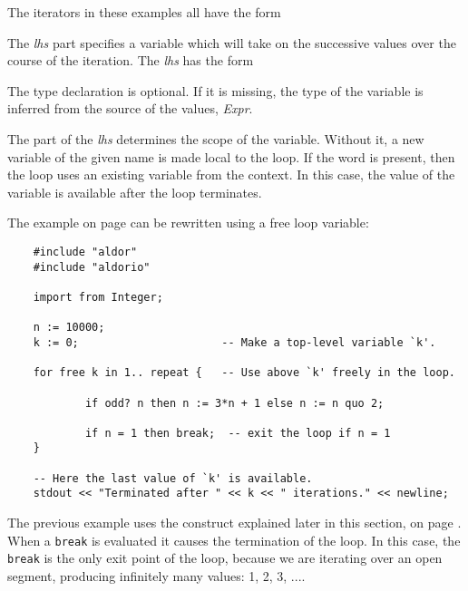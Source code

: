 The  iterators in these examples all have the form



The {\em lhs\/} part specifies a variable which will take on the
successive values over the course of the iteration.
The {\em lhs\/} has the form


The type declaration is optional.  If it is missing, the type of the
variable is inferred from the source of the values, {\em Expr}.

The  part of the {\em lhs} determines the scope of the variable.
Without it, a new variable of the given name is made local to the loop.
If the word  is present, then the loop uses an existing
variable from the context.  In this case, the value of the variable
is available after the loop terminates.

The example on page \pageref{asugLangWhileExample} can be rewritten using a
free loop variable:

\label{asugLangForExample} 

\begin{small}
\begin{verbatim}
    #include "aldor"
    #include "aldorio"

    import from Integer;

    n := 10000;
    k := 0;                      -- Make a top-level variable `k'.

    for free k in 1.. repeat {   -- Use above `k' freely in the loop.

            if odd? n then n := 3*n + 1 else n := n quo 2;

            if n = 1 then break;  -- exit the loop if n = 1
    }

    -- Here the last value of `k' is available.
    stdout << "Terminated after " << k << " iterations." << newline;
\end{verbatim}
\end{small}

The previous example uses the  construct explained later
in this section, on page \pageref{asugLangBreak}.
When a {\tt break} is evaluated it causes the
termination of the loop. In this case, the {\tt break} is the only
exit point of the loop, because we are iterating over an open segment,
producing infinitely many values: 1, 2, 3, ....

